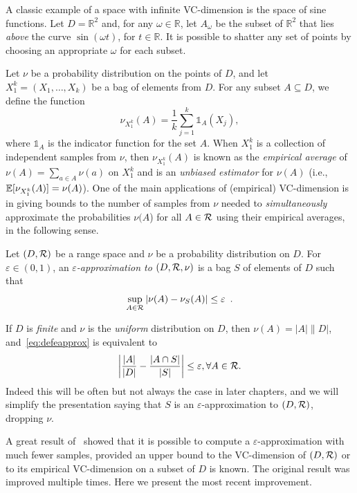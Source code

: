 A classic example of a space with infinite VC-dimension is the space of sine
functions. Let $D=\mathbb{R}^2$ and, for any $\omega\in\mathbb{R}$, let
$A_{\omega}$ be the subset of $\mathbb{R}^2$ that lies \emph{above} the
curve $\sin(\omega t)$, for $t\in \mathbb{R}$. It is possible to
shatter any set of points by choosing an appropriate $\omega$ for each subset.

Let $\nu$ be a probability distribution on the points of $D$, and let
$X_1^k=(X_1,\dotsc,X_k)$ be a bag of elements from $D$. For any subset
$A\subseteq D$, we define the function 
\[
\nu_{X_1^k}(A)=\frac{1}{k}\sum_{j=1}^k\mathds{1}_A(X_j),\]
where $\mathds{1}_A$ is the indicator function for the set $A$. When $X_1^k$ is
a collection of independent samples from $\nu$, then $\nu_{X_1^k}(A)$ is known as the
\emph{empirical average} of $\nu(A)=\sum_{a\in A}\nu(a)$ on $X_1^k$ and is an
\emph{unbiased estimator} for $\nu(A)$ (i.e.,
$\mathbb{E}[\nu_{X_1^k}(A)]=\nu(A)$). One of the main applications of
(empirical) VC-dimension is in giving bounds to the number of samples from $\nu$
needed to \emph{simultaneously} approximate the probabilities $\nu(A$) for all
$A\in\mathcal{R}$ using their empirical averages, in the following sense.

\begin{definition}\label{def:eapprox}
  Let $(D,\mathcal{R})$ be a range space and $\nu$ be a probability distribution on
  $D$. For $\varepsilon\in(0,1)$, an \emph{$\varepsilon$-approximation to
  $(D,\mathcal{R},\nu)$} is a bag $S$ of elements of $D$ such that 
  \begin{equation}\label{eq:defeapprox}
  \sup_{A\in\mathcal{R}}|\nu(A)-\nu_S(A)|\le\varepsilon\enspace.
\end{equation}
\end{definition}

If $D$ is \emph{finite} and $\nu$ is the \emph{uniform} distribution on $D$, then
$\nu(A)=|A|\|D|$, and~\eqref{eq:defeapprox} is equivalent to
\[
\left|\frac{|A|}{|D|}-\frac{|A\cap S|}{|S|}\right|\le\varepsilon, \forall
A\in\mathcal{R}.
\]
Indeed this will be often but not always the case in later chapters, and we will
simplify the presentation saying that $S$ is an $\varepsilon$-approximation to
$(D,\mathcal{R})$, dropping $\nu$.

A great result of~\citet{VapnikC71} showed that it is possible
to compute a $\varepsilon$-approximation with much fewer samples, provided an
upper bound to the VC-dimension of $(D,\mathcal{R})$ or to its empirical VC-dimension
on a subset of $D$ is known. The original result was improved multiple times.
Here we present the most recent improvement.

